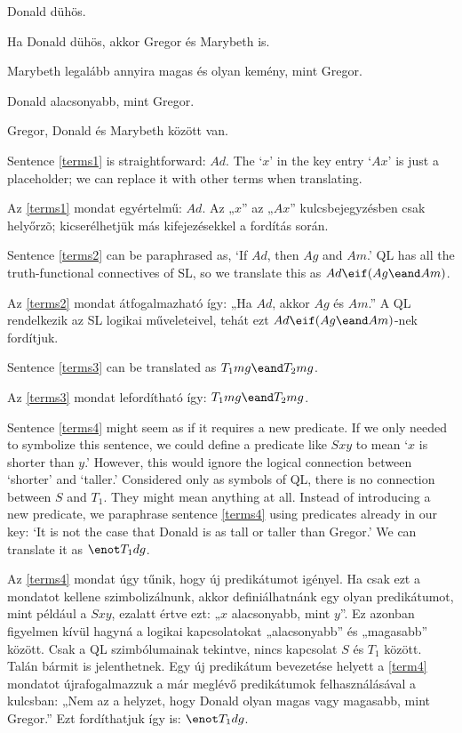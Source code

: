 \begin {earg}
\item [\ex {terms1}] Donald dühös.
\item [\ex {terms2}] Ha Donald dühös, akkor Gregor és Marybeth is.
\item [\ex {terms3}] Marybeth legalább annyira magas és olyan kemény, mint Gregor.
\item [\ex {terms4}] Donald alacsonyabb, mint Gregor.
\item [\ex {terms5}] Gregor, Donald és Marybeth között van.
\end {earg}

Sentence \ref{terms1} is straightforward: $Ad$. The `$x$' in the key entry `$Ax$' is just a placeholder; we can replace it with other terms when translating.

Az \ref{terms1} mondat egyértelmű: $Ad$. Az „$x$” az „$Ax$” kulcsbejegyzésben csak helyőrzõ; kicserélhetjük más kifejezésekkel a fordítás során.

Sentence \ref{terms2} can be paraphrased as, `If $Ad$, then $Ag$ and $Am$.' QL has all the truth-functional connectives of SL, so we translate this as $Ad \eif (Ag \eand Am)$.

Az \ref{terms2} mondat átfogalmazható így: „Ha $Ad$, akkor $Ag$ és $Am$.” A QL rendelkezik az SL logikai műveleteivel, tehát ezt $Ad \eif(Ag \eand Am)$-nek fordítjuk.

Sentence \ref{terms3} can be translated as $T_1mg \eand T_2mg$.

Az \ref{terms3} mondat lefordítható így: $T_1mg \eand T_2mg $.

Sentence \ref{terms4} might seem as if it requires a new predicate. If we only needed to symbolize this sentence, we could define a predicate like $Sxy$ to mean `$x$ is shorter than $y$.' However, this would ignore the logical connection between `shorter' and `taller.' Considered only as symbols of QL, there is no connection between $S$ and $T_1$. They might mean anything at all. Instead of introducing a new predicate, we paraphrase sentence \ref{terms4} using predicates already in our key: `It is not the case that Donald is as tall or taller than Gregor.' We can translate it as $\enot T_1dg$.

Az \ref{terms4} mondat úgy tűnik, hogy új predikátumot igényel. Ha csak ezt a mondatot kellene szimbolizálnunk, akkor definiálhatnánk egy olyan predikátumot, mint például a $Sxy$, ezalatt értve ezt: „$x$ alacsonyabb, mint $y$”. Ez azonban figyelmen kívül hagyná a logikai kapcsolatokat „alacsonyabb” és „magasabb” között. Csak a QL szimbólumainak tekintve, nincs kapcsolat $S$ és $T_1$ között. Talán bármit is jelenthetnek. Egy új predikátum bevezetése helyett a \ref{term4} mondatot újrafogalmazzuk a már meglévő predikátumok felhasználásával a kulcsban: „Nem az a helyzet, hogy Donald olyan magas vagy magasabb, mint Gregor.” Ezt fordíthatjuk így is: $ \enot T_1dg$.

